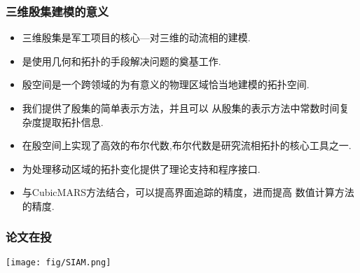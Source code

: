 \documentclass[UTF8]{ctexbeamer}	%
\theoremstyle{plain}
\theoremstyle{definition}
\theoremstyle{remark}
\numberwithin{equation}{section}
\begin{document}
\begin{frame}
    \frametitle{三维殷集建模的意义}
    \begin{itemize}
        \item 三维殷集是军工项目的核心---对三维的动流相的建模.
        \item 是使用几何和拓扑的手段解决问题的奠基工作.
    \end{itemize}

    \begin{itemize}
        \item 殷空间是一个跨领域的为有意义的物理区域恰当地建模的拓扑空间.
        \item 我们提供了殷集的简单表示方法，并且可以
        从殷集的表示方法中常数时间复杂度提取拓扑信息.
        \item 在殷空间上实现了高效的布尔代数,布尔代数是研究流相拓扑的核心工具之一.
        \item 为处理移动区域的拓扑变化提供了理论支持和程序接口.
        \item 与CubicMARS方法结合，可以提高界面追踪的精度，进而提高
        数值计算方法的精度.
        \end{itemize}
\end{frame}

\begin{frame}
    \frametitle{论文在投}
    \texttt{[image: fig/SIAM.png]}
\end{frame}

    
\end{document}
